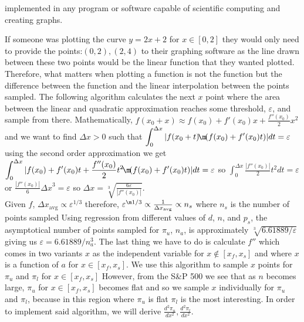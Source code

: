 \documentclass[12pt,letterpaper]{article}
\begin{document}
implemented in any program or software capable of scientific computing and creating graphs. 
\par
If someone was plotting the curve $y=2x+2$ for $x\in [0,2]$ they would only need to provide the points:$(0,2),(2,4)$ to their graphing software 
as the line drawn between these two points would be the linear function that they wanted plotted. 
Therefore, what matters when plotting a function is not the function but the difference between the function and
the linear interpolation between the points sampled. The following algorithm calculates the next $x$ point where the area 
between the linear and quadratic approximation reaches some threshold, $\varepsilon$, and sample from there. 
Mathematically, $\displaystyle{f(x_0+x)\approx f(x_0)+f'(x_0)x+\frac{f''(x_0)}{2}x^2}$
and we want to find $\Delta x>0$ such that  $\displaystyle{\int_{0}^{\Delta x}{|f(x_0+t)\!\m\! (f(x_0)+f'(x_0)t)|dt} = \varepsilon}$ 
using the second order approximation we get $\displaystyle{\int_{0}^{\Delta x}{|f(x_0)+f'(x_0)t+\frac{f''(x_0)}{2}t^2\!\m\! (f(x_0)+f'(x_0)t)|dt} = \varepsilon}$  
so \allowbreak $\displaystyle{\int_{0}^{\Delta x}{\frac{|f''(x_0)|}{2}t^2dt} = \varepsilon}$  or 
$\displaystyle{\frac{|f''(x_0)|}{6}{\Delta x}^3=\varepsilon}$ 
so $\displaystyle{\Delta x=\sqrt[3]{\frac{6\varepsilon}{|f''(x_0)|}}}$. \\
Given $f$, $\Delta x_\text{avg} \propto \varepsilon^{1/3}$ therefore,
$\varepsilon^{\m 1/3}\propto \frac{1}{\Delta x_\text{avg}} \propto n_s$ where $n_s$ is the number of points sampled
Using regression from different values of $d$, $n$, and $p_s$, 
the asymptotical number of points sampled for $\pi_u$, $n_a$,  is approximately 
$\sqrt[3]{6.61889/\varepsilon}$ giving us $\varepsilon=6.61889/n_a^3$. 
The last thing we have to do is calculate $\displaystyle{f''}$ which comes in two variants $x$ as the independent variable
for $x\notin[x_f,x_s]$ and where $x$ is a function of $a$ for $x \in[x_f,x_s]$. 
We use this algorithm to sample $x$ points for $\pi_u$ and $\pi_l$ for $x \in[x_f,x_s]$
However, from the S\&P 500 we see that as $n$ becomes large, $\pi_u$ for $x \in[x_f,x_s]$ becomes flat and so we sample $x$ individually for 
$\pi_u$ and $\pi_l$, because in this region where $\pi_u$ is flat $\pi_l$ is the most interesting.
In order to implement said algorithm, we will derive $\displaystyle{\frac{d^2{\pi_u}}{d{x}^2},\frac{d^2{\pi_l}}{d{x}^2}}$. \vspace{.34ex}
\end{document}
